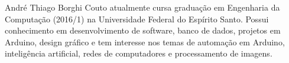 \documentclass[10pt,journal,compsoc]{IEEEtran}
\begin{document}



\newpage
\begin{IEEEbiographynophoto}{André Thiago Borghi Couto}
atualmente cursa graduação em Engenharia da Computação (2016/1) na Universidade Federal do Espírito Santo. Possui conhecimento em desenvolvimento de software, banco de dados, projetos em Arduino, design gráfico e tem interesse nos temas de automação em Arduino, inteligência artificial, redes de computadores e processamento de imagens.
\end{IEEEbiographynophoto}
\end{document}
